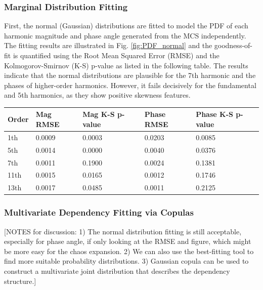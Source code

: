 \subsubsection{Marginal Distribution Fitting}
First, the normal (Gaussian) distributions are fitted to model the PDF of each harmonic magnitude and phase angle generated from the MCS independently. The fitting results are illustrated in Fig. \ref{fig:PDF_normal} and the goodness-of-fit is quantified using the Root Mean Squared Error (RMSE) and the Kolmogorov-Smirnov (K-S) p-value as listed in the following table. The results indicate that the normal distributions are plausible for the 7th harmonic and the phases of higher-order harmonics. However, it fails decisively for the fundamental and 5th harmonics, as they show positive skewness features.
\begin{table}[ht!]
    \centering
    \begin{tabular}{ l l l l l }
        Order &  Mag \newline RMSE & Mag \newline K-S p-value & Phase \newline RMSE & Phase \newline K-S p-value \\
        \hline
        1th  & 0.0009 & 0.0003 & 0.0203 & 0.0085 \\
        5th  & 0.0014 & 0.0000 & 0.0040 & 0.0376 \\
        7th  & 0.0011 & 0.1900 & 0.0024 & 0.1381 \\
        11th & 0.0015 & 0.0165 & 0.0012 & 0.1746 \\
        13th & 0.0017 & 0.0485 & 0.0011 & 0.2125
    \end{tabular}
\end{table}

\subsubsection{Multivariate Dependency Fitting via Copulas}
[NOTES for discussion: 1) The normal distribution fitting is still acceptable, especially for phase angle, if only looking at the RMSE and figure, which might be more easy for the chaos expansion. 2) We can also use the best-fitting tool to find more suitable probability distributions. 3) Gaussian copula can be used to construct a multivariate joint distribution that describes the dependency structure.]
